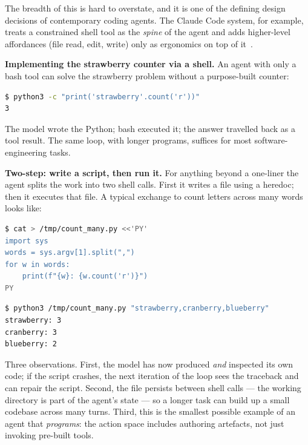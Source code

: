The breadth of this is hard to overstate, and it is one of the
defining design decisions of contemporary coding agents. The Claude
Code system, for example, treats a constrained shell tool as the
\emph{spine} of the agent and adds higher-level affordances (file
read, edit, write) only as ergonomics on top of it~\citep{liu2026claudecode}.

\begin{examplebox}
\small
\textbf{Implementing the strawberry counter via a shell.} An agent
with only a bash tool can solve the strawberry problem without a
purpose-built counter:

\begin{lstlisting}[language=bash]
$ python3 -c "print('strawberry'.count('r'))"
3
\end{lstlisting}

\noindent
The model wrote the Python; bash executed it; the answer travelled
back as a tool result. The same loop, with longer programs, suffices
for most software-engineering tasks.
\end{examplebox}

\begin{examplebox}
\small
\textbf{Two-step: write a script, then run it.} For anything beyond
a one-liner the agent splits the work into two shell calls. First it
writes a file using a heredoc; then it executes that file. A typical
exchange to count letters across many words looks like:

\begin{lstlisting}[language=bash,caption={First shell call --- create a script file.}]
$ cat > /tmp/count_many.py <<'PY'
import sys
words = sys.argv[1].split(",")
for w in words:
    print(f"{w}: {w.count('r')}")
PY
\end{lstlisting}

\begin{lstlisting}[language=bash,caption={Second shell call --- execute the script.}]
$ python3 /tmp/count_many.py "strawberry,cranberry,blueberry"
strawberry: 3
cranberry: 3
blueberry: 2
\end{lstlisting}

\noindent
Three observations. First, the model has now produced \emph{and}
inspected its own code; if the script crashes, the next iteration of
the loop sees the traceback and can repair the script. Second, the
file persists between shell calls --- the working directory is part
of the agent's state --- so a longer task can build up a small
codebase across many turns. Third, this is the smallest possible
example of an agent that \emph{programs}: the action space includes
authoring artefacts, not just invoking pre-built tools.
\end{examplebox}

